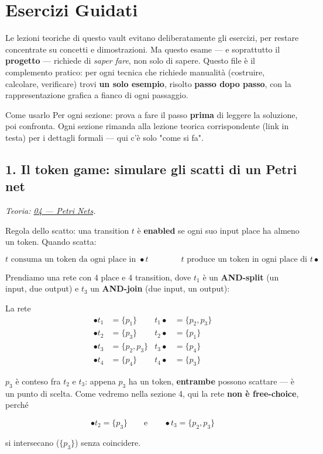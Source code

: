 \chapter{\texorpdfstring{Esercizi Guidati}{Esercizi Guidati}}
\label{ch:22}

Le lezioni teoriche di questo vault evitano deliberatamente gli esercizi, per restare concentrate su concetti e dimostrazioni. Ma questo esame — e soprattutto il \textbf{progetto} — richiede di \emph{saper fare}, non solo di sapere. Questo file è il complemento pratico: per ogni tecnica che richiede manualità (costruire, calcolare, verificare) trovi \textbf{un solo esempio}, risolto \textbf{passo dopo passo}, con la rappresentazione grafica a fianco di ogni passaggio.

\begin{boxtip}{Come usarlo}
Per ogni sezione: prova a fare il passo \textbf{prima} di leggere la soluzione, poi confronta. Ogni sezione rimanda alla lezione teorica corrispondente (link in testa) per i dettagli formali — qui c'è solo "come si fa".
\end{boxtip}

\section{\texorpdfstring{1. Il token game: simulare gli scatti di un Petri net}{1. Il token game: simulare gli scatti di un Petri net}}

\emph{Teoria: \hyperref[ch:04]{04 — Petri Nets}.}

Regola dello scatto: una transition $t$ è \textbf{enabled} se ogni suo input place ha almeno un token. Quando scatta:

\[
t \text{ consuma un token da ogni place in } \bullet t \qquad\qquad t \text{ produce un token in ogni place di } t\bullet
\]

Prendiamo una rete con 4 place e 4 transition, dove $t_1$ è un \textbf{AND-split} (un input, due output) e $t_3$ un \textbf{AND-join} (due input, un output):

\begin{boxnote}{La rete}
\[
\begin{aligned}
\bullet t_1 &= \{p_1\} & t_1\bullet &= \{p_2,p_3\} \\[4pt]
\bullet t_2 &= \{p_3\} & t_2\bullet &= \{p_1\} \\[4pt]
\bullet t_3 &= \{p_2,p_3\} & t_3\bullet &= \{p_4\} \\[4pt]
\bullet t_4 &= \{p_4\} & t_4\bullet &= \{p_3\}
\end{aligned}
\]

$p_3$ è conteso fra $t_2$ e $t_3$: appena $p_3$ ha un token, \textbf{entrambe} possono scattare — è un punto di scelta. Come vedremo nella sezione 4, qui la rete \textbf{non è free-choice}, perché

\[
\bullet t_2 = \{p_3\} \qquad\text{e}\qquad \bullet t_3 = \{p_2,p_3\}
\]

si intersecano ($\{p_3\}$) senza coincidere.
\end{boxnote}

